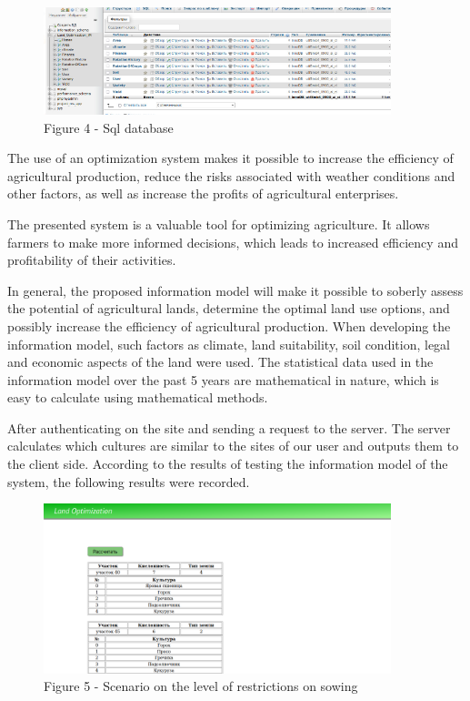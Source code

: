 \begin{figure}[H]
	\centering
	\includegraphics[width=0.9\textwidth]{assets/71}
	\caption*{Figure 4 - Sql database}
\end{figure}

\begin{multicols}{2}
The use of an optimization system makes it possible to increase the
efficiency of agricultural production, reduce the risks associated with
weather conditions and other factors, as well as increase the profits of
agricultural enterprises.

The presented system is a valuable tool for optimizing agriculture. It
allows farmers to make more informed decisions, which leads to increased
efficiency and profitability of their activities.

In general, the proposed information model will make it possible to
soberly assess the potential of agricultural lands, determine the
optimal land use options, and possibly increase the efficiency of
agricultural production. When developing the information model, such
factors as climate, land suitability, soil condition, legal and economic
aspects of the land were used. The statistical data used in the
information model over the past 5 years are mathematical in nature,
which is easy to calculate using mathematical methods.

After authenticating on the site and sending a request to the server.
The server calculates which cultures are similar to the sites of our
user and outputs them to the client side. According to the results of
testing the information model of the system, the following results were
recorded.
\end{multicols}

\begin{figure}[H]
	\centering
	\includegraphics[width=0.9\textwidth]{assets/72}
	\caption*{Figure 5 - Scenario on the level of restrictions on sowing}
\end{figure}

